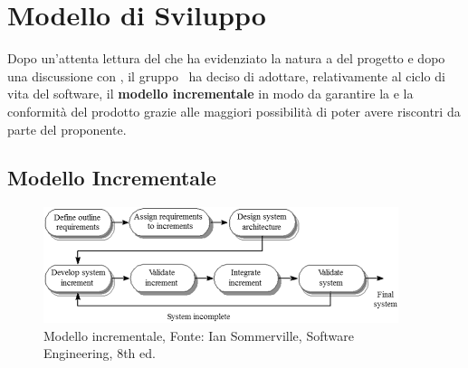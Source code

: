 \section{Modello di Sviluppo}
\label{modello_di_sviluppo}
Dopo un'attenta lettura del  che ha evidenziato la natura a  del progetto e dopo una discussione con \Proponente, il gruppo \Gruppo\ ha deciso di adottare, relativamente al ciclo di vita del software, il \textbf{modello incrementale} in modo da garantire la  e la conformità del prodotto grazie alle maggiori possibilità di poter avere riscontri da parte del proponente. 

\subsection{Modello Incrementale}
\begin{figure}[ht]
    \centering
    \includegraphics[]{Immagini/ModelloIncrementale.png}
    \caption{Modello incrementale, Fonte: Ian Sommerville, Software Engineering, 8th ed.}
    \label{fig:modello_incrementale}
\end{figure}

